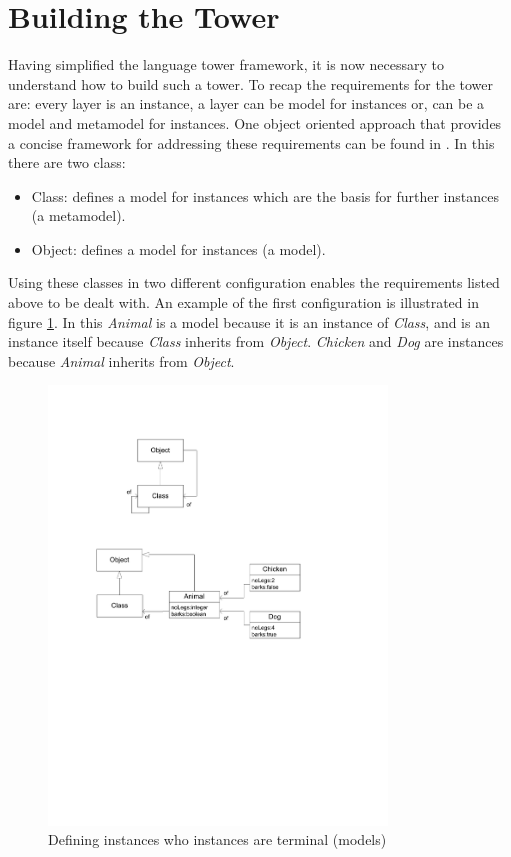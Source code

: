 \section{Building the Tower}

Having simplified the language tower framework, it is now necessary to understand how to build such a tower.  To recap the requirements for the tower are: every layer is an instance, a layer can be model for instances or, can be a model and metamodel for instances.  One object oriented approach that provides a concise framework for addressing these requirements can be found in \cite{objVlisp}.  In this there are two class:

\begin{itemize}
\item Class: defines a model for instances which are the basis for further instances (a metamodel).
\item Object: defines a model for instances (a model).
\end{itemize}

\noindent Using these classes in two different configuration enables the requirements listed above to be dealt with.  An example of the first configuration is illustrated in figure \ref{core2}.  In this \emph{Animal} is a model because it is an instance of \emph{Class}, and is an instance itself because \emph{Class} inherits from \emph{Object}.  \emph{Chicken} and \emph{Dog} are instances because \emph{Animal} inherits from \emph{Object}.

\begin{figure}[htb]
\begin{center}
\includegraphics[width=9cm]{MetaToolArchitecture/figures/core2.pdf}
\caption{Defining instances who instances are terminal (models)}
\label{core2}
\end{center}
\end{figure}

